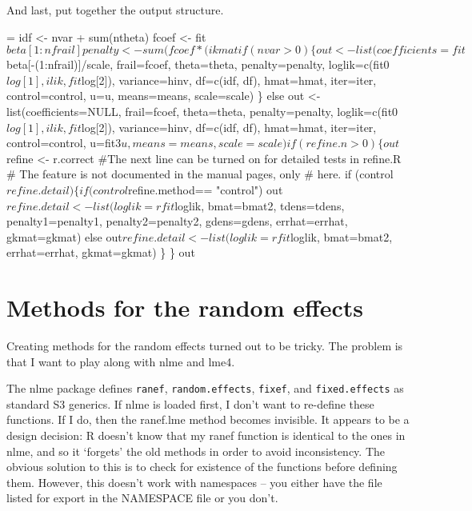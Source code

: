 \documentclass{article}
\begin{document}
And last, put together the output structure.
\begin{nwchunk}
=
 idf <- nvar + sum(ntheta)
 fcoef <- fit$beta[1:nfrail]
 penalty <- sum(fcoef * (ikmat %
 
 if (nvar > 0) \{
     out <- list(coefficients = fit$beta[-(1:nfrail)]/scale, frail=fcoef, 
          theta=theta, penalty=penalty,
          loglik=c(fit0$log[1], ilik, fit$log[2]), variance=hinv,
          df=c(idf, df), hmat=hmat, iter=iter, control=control,
          u=u, means=means, scale=scale)
     \}
 else out <- list(coefficients=NULL, frail=fcoef, 
                  theta=theta, penalty=penalty,
           loglik=c(fit0$log[1], ilik, fit$log[2]), variance=hinv,
           df=c(idf, df), hmat=hmat, iter=iter, control=control,
           u=fit3$u, means=means, scale=scale)    
 
 if (refine.n>0) \{
     out$refine <- r.correct
     #The next line can be turned on for detailed tests in refine.R
     #  The feature is not documented in the manual pages, only
     #  here.
     if (control$refine.detail) \{
         if (control$refine.method== "control")
             out$refine.detail <-list(loglik=rfit$loglik, bmat=bmat2, 
                                      tdens=tdens,
                                      penalty1=penalty1, penalty2=penalty2,
                                      gdens=gdens, errhat=errhat, gkmat=gkmat)
         else out$refine.detail <- list(loglik=rfit$loglik, bmat=bmat2,
                                        errhat=errhat, gkmat=gkmat)
     \}
 \}
 out
\end{nwchunk}
\section{Methods for the random effects}
Creating methods for the random effects turned out to be tricky.
The problem is that I want to play along with nlme and lme4.

The nlme package defines \Verb!ranef!, \Verb?random.effects?, \Verb+fixef+, and
\Verb!fixed.effects! as standard S3 generics. 
If nlme is loaded first, I don't want to re-define these functions.
If I do, then the ranef.lme method becomes invisible.  
It appears to be a design decision: R doesn't know
that my ranef function is identical to the ones in nlme, and
so it `forgets' the old methods in order to avoid inconsistency.
The obvious solution to this is to check for existence of the functions
before defining them.
However, this doesn't work with namespaces -- you either have the file
listed for export in the NAMESPACE file or you don't.
\end{document}

